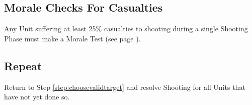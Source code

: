 \subsection{Morale Checks For Casualties}
Any Unit suffering at least 25\% casualties to shooting during a
single Shooting Phase must make a Morale Test (see page
\pageref{sec:morale}).

\subsection{Repeat}
Return to Step \ref{step:choosevalidtarget} and resolve Shooting for all Units that have
not yet done so.

\stopcountsubsections